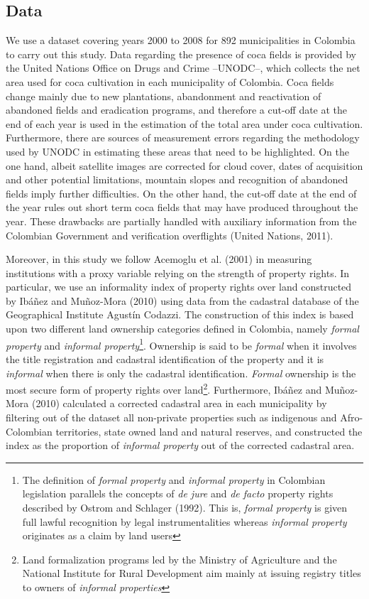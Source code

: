 \subsection{Data}
\label{data}

We use a dataset covering years 2000 to 2008 for 892 municipalities in Colombia to carry out this study. Data regarding the presence of coca fields is provided by the United Nations Office on Drugs and Crime --UNODC--, which collects the net area used for coca cultivation in each municipality of Colombia. Coca fields change mainly due to new plantations, abandonment and reactivation of abandoned fields and eradication programs, and therefore a cut-off date at the end of each year is used in the estimation of the total area under coca cultivation. Furthermore, there are sources of measurement errors regarding the methodology used by UNODC in estimating these areas that need to be highlighted. On the one hand, albeit satellite images are corrected for cloud cover, dates of acquisition and other potential limitations, mountain slopes and recognition of abandoned fields imply further difficulties. On the other hand, the cut-off date at the end of the year rules out short term coca fields that may have produced throughout the year. These drawbacks are partially handled with auxiliary information from the Colombian Government and verification overflights (United Nations, 2011).

Moreover, in this study we follow Acemoglu et al. (2001) in measuring institutions with a proxy variable relying on the strength of property rights. In particular, we use an informality index of property rights over land constructed by Ib\'{a}\~{n}ez and Mu\~{n}oz-Mora (2010) using data from the cadastral database of the Geographical Institute Agust\'{i}n Codazzi. The construction of this index is based upon two different land ownership categories defined in Colombia, namely \emph{formal property} and \emph{informal property}\footnote{The definition of \emph{formal property} and \emph{informal property} in Colombian legislation parallels the concepts of \emph{de jure} and \emph{de facto} property rights described by Ostrom and Schlager (1992). This is, \emph{formal property} is given full lawful recognition by legal instrumentalities whereas \emph{informal property} originates as a claim by land users}. Ownership is said to be \emph{formal} when it involves the title registration and cadastral identification of the property and it is \emph{informal} when there is only the cadastral identification. \emph{Formal} ownership is the most secure form of property rights over land\footnote{Land formalization programs led by the Ministry of Agriculture and the National Institute for Rural Development aim mainly at issuing registry titles to owners of \emph{informal properties}}. Furthermore, Ib\'{a}\~{n}ez and Mu\~{n}oz-Mora (2010) calculated a corrected cadastral area in each municipality by filtering out of the dataset all non-private properties such as indigenous and Afro-Colombian territories, state owned land and natural reserves, and constructed the index as the proportion of \emph{informal property} out of the corrected cadastral area.

